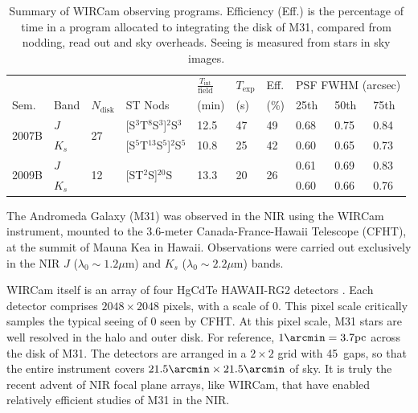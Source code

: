 \documentclass[iop]{emulateapj}
\begin{document}
\begin{table}[t]
    \caption[Summary of WIRCam observing programs]{Summary of WIRCam observing programs. Efficiency (Eff.) is the percentage of time in a program allocated to integrating the disk of M31, compared from nodding, read out and sky overheads. Seeing is measured from stars in sky images.}
    \label{tab:obssummary}
    
    \centering
    \begin{tabular}{llllllllll}
        & & & & $\frac{T_\mathrm{int}}{\mathrm{field}}$ & $T_\mathrm{exp}$ & Eff. & \multicolumn{3}{c}{PSF FWHM (arcsec)} \\ \cline{8-10}
    Sem. & Band & $N_\mathrm{disk}$ & ST Nods & (min) &  (s) &  (\%) & 25th  & 50th & 75th \\
    \hline
    \multirow{2}{*}{2007B} & $J$ & \multirow{2}{*}{27} & [S$^3$T$^8$S$^3$]$^{2}$S$^3$ & 12.5 & 47 & 49 & 0.68 & 0.75 & 0.84 \\
     & $K_s$ &  & [S$^5$T$^{13}$S$^5$]${^2}$S$^5$ & 10.8 & 25 & 42 & 0.60 &  0.65 & 0.73 \\
     \hline
     \multirow{2}{*}{2009B} & $J$ & \multirow{2}{*}{12} & \multirow{2}{*}{[ST$^2$S]$^{20}$S} & \multirow{2}{*}{13.3} & \multirow{2}{*}{20} & \multirow{2}{*}{26} & 0.61 & 0.69 & 0.83 \\
      & $K_s$ & & & & &  & 0.60 & 0.66 & 0.76 \\
    \end{tabular}
\end{table}


The Andromeda Galaxy (M31) was observed in the NIR using the WIRCam instrument, mounted to the 3.6-meter Canada-France-Hawaii Telescope (CFHT), at the summit of Mauna Kea in Hawaii. Observations were carried out exclusively in the NIR $J$ ($\lambda_0 \sim 1.2 \mu\mathrm{m}$) and $K_s$ ($\lambda_0 \sim 2.2 \mu\mathrm{m}$) bands.

WIRCam itself is an array of four HgCdTe HAWAII-RG2 detectors \citep{Puget:2004}. Each detector comprises $2048\times 2048$ pixels, with a scale of 0. This pixel scale critically samples the typical seeing of 0 seen by CFHT. At this pixel scale, M31 stars are well resolved in the halo and outer disk. For reference, $1\arcmin = 3.7\mathrm{pc}$ across the disk of M31. The detectors are arranged in a $2\times 2$ grid with 45\arcsec\ gaps, so that the entire instrument covers $21.5\arcmin \times 21.5\arcmin$ of sky. It is truly the recent advent of NIR focal plane arrays, like WIRCam, that have enabled relatively efficient studies of M31 in the NIR.
\end{document}
